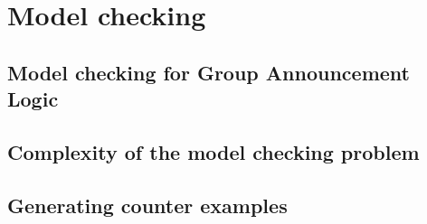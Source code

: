 %

\section{Model checking}\label{sec:impl}


\subsection{Model checking for Group Announcement Logic}

\subsection{Complexity of the model checking problem}

\subsection{Generating counter examples}